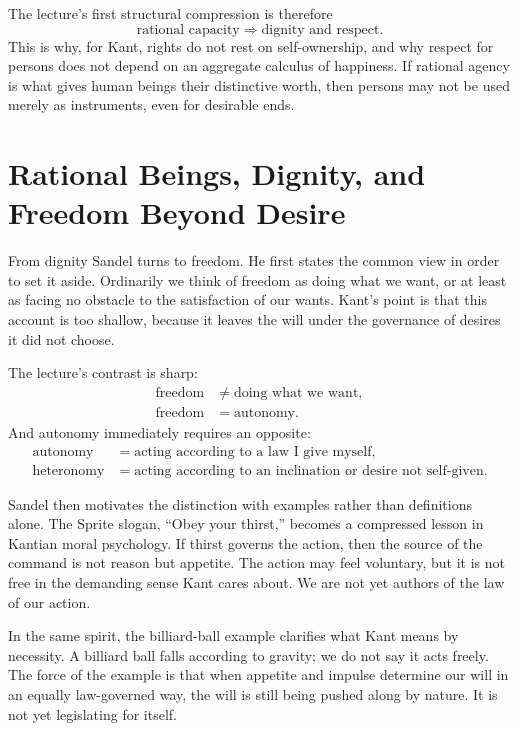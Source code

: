 The lecture's first structural compression is therefore
\begin{equation}
\text{rational capacity} \Longrightarrow \text{dignity and respect}.
\end{equation}
This is why, for Kant, rights do not rest on self-ownership, and why respect for persons does not depend on an aggregate calculus of happiness. If rational agency is what gives human beings their distinctive worth, then persons may not be used merely as instruments, even for desirable ends.

\section{Rational Beings, Dignity, and Freedom Beyond Desire}

From dignity Sandel turns to freedom. He first states the common view in order to set it aside. Ordinarily we think of freedom as doing what we want, or at least as facing no obstacle to the satisfaction of our wants. Kant's point is that this account is too shallow, because it leaves the will under the governance of desires it did not choose.

The lecture's contrast is sharp:
\begin{align}
\text{freedom} &\neq \text{doing what we want},\\
\text{freedom} &= \text{autonomy}.
\end{align}
And autonomy immediately requires an opposite:
\begin{align}
\text{autonomy} &= \text{acting according to a law I give myself},\\
\text{heteronomy} &= \text{acting according to an inclination or desire not self-given}.
\end{align}

Sandel then motivates the distinction with examples rather than definitions alone. The Sprite slogan, ``Obey your thirst,'' becomes a compressed lesson in Kantian moral psychology. If thirst governs the action, then the source of the command is not reason but appetite. The action may feel voluntary, but it is not free in the demanding sense Kant cares about. We are not yet authors of the law of our action.

In the same spirit, the billiard-ball example clarifies what Kant means by necessity. A billiard ball falls according to gravity; we do not say it acts freely. The force of the example is that when appetite and impulse determine our will in an equally law-governed way, the will is still being pushed along by nature. It is not yet legislating for itself.

